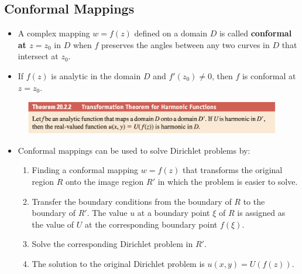 \documentclass{article}
\begin{document}
\subsection{Conformal Mappings}

\begin{itemize}
  \item A complex mapping $w = f(z)$ defined on a domain $D$ is called \textbf{conformal at $z = z_0$} in $D$ when $f$ preserves the angles between any two curves in $D$ that intersect at $z_0$.

  \item If $f(z)$ is analytic in the domain $D$ and $f'(z_0) \ne 0$, then $f$ is conformal at $z = z_0$.
\end{itemize}

\begin{figure}[H]
  \centering
  \includegraphics[width=\textwidth]{transformation-theorem-for-harmonic-functions}
\end{figure}

\begin{itemize}
  \item Conformal mappings can be used to solve Dirichlet problems by:

        \begin{enumerate}
          \item Finding a conformal mapping $w = f(z)$ that transforms the original region $R$ onto the image region $R'$ in which the problem is easier to solve.

          \item Transfer the boundary conditions from the boundary of $R$ to the boundary of $R'$. The value $u$ at a boundary point $\xi$ of $R$ is assigned as the value of $U$ at the corresponding boundary point $f(\xi)$.

          \item Solve the corresponding Dirichlet problem in $R'$.

          \item The solution to the original Dirichlet problem is $u(x, y) = U(f(z))$.
        \end{enumerate}
\end{itemize}
\end{document}
